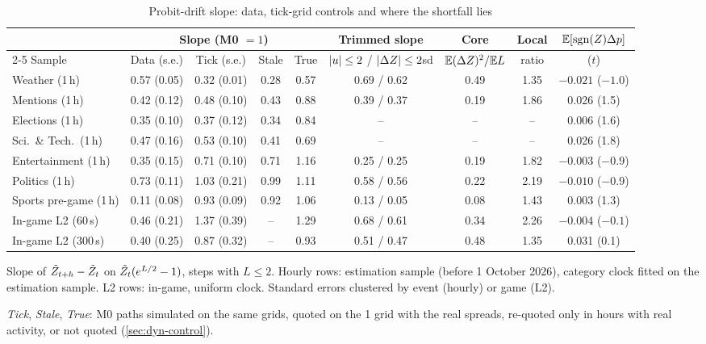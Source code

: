 \begin{table}[t]
\centering
\begin{threeparttable}
\caption{Probit-drift slope: data, tick-grid controls and where the shortfall lies}\label{tab:dyn-drift}
\scriptsize
\setlength{\tabcolsep}{2.5pt}
\begin{tabular}{lcccccccc}
\toprule
 & \multicolumn{4}{c}{Slope (M0 $=1$)} & Trimmed slope & Core & Local & $\mathbb{E}[\operatorname{sgn}(Z)\Delta p]$ \\
\cmidrule(lr){2-5}
Sample & Data (s.e.) & Tick (s.e.) & Stale & True & $|u|\le2$ / $|\Delta Z|\le2$sd & $\mathbb{E}(\Delta Z)^2/\mathbb{E} L$ & ratio & \cents{} ($t$) \\
\midrule
Weather (1\,h) & 0.57 (0.05) & 0.32 (0.01) & 0.28 & 0.57 & 0.69 / 0.62 & 0.49 & 1.35 & $-0.021$ ($-1.0$) \\
Mentions (1\,h) & 0.42 (0.12) & 0.48 (0.10) & 0.43 & 0.88 & 0.39 / 0.37 & 0.19 & 1.86 & 0.026 (1.5) \\
Elections (1\,h) & 0.35 (0.10) & 0.37 (0.12) & 0.34 & 0.84 & -- & -- & -- & 0.006 (1.6) \\
Sci.\ \& Tech.\ (1\,h) & 0.47 (0.16) & 0.53 (0.10) & 0.41 & 0.69 & -- & -- & -- & 0.026 (1.8) \\
Entertainment (1\,h) & 0.35 (0.15) & 0.71 (0.10) & 0.71 & 1.16 & 0.25 / 0.25 & 0.19 & 1.82 & $-0.003$ ($-0.9$) \\
Politics (1\,h) & 0.73 (0.11) & 1.03 (0.21) & 0.99 & 1.11 & 0.58 / 0.56 & 0.22 & 2.19 & $-0.010$ ($-0.9$) \\
Sports pre-game (1\,h) & 0.11 (0.08) & 0.93 (0.09) & 0.92 & 1.06 & 0.13 / 0.05 & 0.08 & 1.43 & 0.003 (1.3) \\
In-game L2 (60\,s) & 0.46 (0.21) & 1.37 (0.39) & -- & 1.29 & 0.68 / 0.61 & 0.34 & 2.26 & $-0.004$ ($-0.1$) \\
In-game L2 (300\,s) & 0.40 (0.25) & 0.87 (0.32) & -- & 0.93 & 0.51 / 0.47 & 0.48 & 1.35 & 0.031 (0.1) \\
\bottomrule
\end{tabular}
\begin{tablenotes}[flushleft]\footnotesize
\item Slope of $\tilde{Z}_{t+h}-\tilde{Z}_t$ on $\tilde{Z}_t(e^{L/2}-1)$, steps with $L\le2$. Hourly rows: estimation sample (before 1 October 2026), category clock fitted on the estimation sample. L2 rows: in-game, uniform clock. Standard errors clustered by event (hourly) or game (L2).
\item \emph{Tick}, \emph{Stale}, \emph{True}: M0 paths simulated on the same grids, quoted on the 1\cents{} grid with the real spreads, re-quoted only in hours with real activity, or not quoted (\cref{sec:dyn-control}).

\end{tablenotes}
\end{threeparttable}
\end{table}
